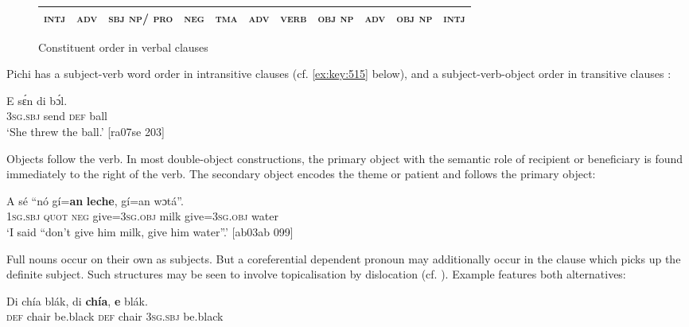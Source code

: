 \begin{figure}
\caption{Constituent order in verbal clauses}
\label{fig:key:7.1}

\begin{tabularx}{\textwidth}{XXXXXXXXXXX}
\toprule
\textsc{intj} & \textsc{adv} & \textsc{sbj} \textsc{np/} \textsc{pro} & \textsc{neg} & \textsc{tma} & \textsc{adv} & \textsc{verb} & \textsc{obj} \textsc{np} & \textsc{adv} & \textsc{obj} \textsc{np} & \textsc{intj}\\
\bottomrule
\end{tabularx}
\end{figure}
Pichi has a subject-verb word order in intransitive clauses (cf. \ref{ex:key:515} below), and a subject-verb-object order in transitive clauses : 


\ea%
    \label{ex:key:513}
    \gll E    sɛ́n    di  bɔ́l.\\
\textsc{3sg.sbj}  send  \textsc{def}  ball\\

\glt ‘She threw the ball.’ [ra07se 203]
\z

Objects follow the verb. In most double-object constructions, the primary object with the semantic role of recipient or beneficiary is found immediately to the right of the verb. The secondary object encodes the theme or patient and follows the primary object:


\ea%
    \label{ex:key:514}
    \gll A    sé    “nó  gí=\textbf{an}    \textbf{leche},  gí=an    wɔtá”.\\
\textsc{1sg.sbj}  \textsc{quot}    \phantom{“}\textsc{neg}  give=\textsc{3sg.obj}  milk    give=\textsc{3sg.obj}  water\\

\glt ‘I said “don’t give him milk, give him water”.' [ab03ab 099]
\z

Full nouns occur on their own as subjects. But a coreferential dependent pronoun may additionally occur in the clause which picks up the definite subject. Such structures may be seen to involve topicalisation by dislocation (cf. ). Example  features both alternatives:


\ea%
    \label{ex:key:515}
    \gll Di  chía    blák,  di  \textbf{chía},  \textbf{e}    blák.\\
\textsc{def}  chair  be.black  \textsc{def}  chair  \textsc{3sg.sbj}  be.black\\

